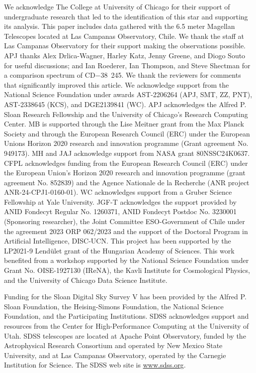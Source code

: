\documentclass{natureprintstyle}
\newcommand{\cdstar}{CD$-$38~245\xspace}
\begin{document}
\begin{addendum}
  
\item [Acknowledgements] 

We acknowledge The College at University of Chicago for their support of undergraduate research that led to the identification of this star and supporting its analysis.
This paper includes data gathered with the 6.5 meter Magellan Telescopes located at Las Campanas Observatory, Chile. We thank the staff at Las Campanas Observatory for their support making the observations possible.
APJ thanks Alex Drlica-Wagner, Harley Katz, Jenny Greene, and Diogo Souto for useful discussions; 
and Ian Roederer, Ian Thompson, and Steve Shectman for a comparison spectrum of \cdstar.
We thank the reviewers for comments that significantly improved this article.
We acknowledge support from the National Science Foundation under awards 
AST-2206264 (APJ, SMT, ZZ, PNT),
AST-2338645 (KCS),
and DGE2139841 (WC).
APJ acknowledges the Alfred P. Sloan Research Fellowship and the University of Chicago's Research Computing Center.
MB is supported through the Lise Meitner grant from the Max Planck Society and through the European Research Council (ERC) under the European Unions Horizon 2020 research and innovation programme (Grant agreement No. 949173). 
MH and JAJ acknowledge support from NASA grant 80NSSC24K0637.
CFPL acknowledges funding from the European Research Council (ERC) under the European Union’s Horizon 2020 research and innovation programme (grant agreement No. 852839) and the Agence Nationale de la Recherche (ANR project ANR-24-CPJ1-0160-01).
WC acknowledges support from a Gruber Science Fellowship at Yale University.
JGF-T acknowledges the support provided by ANID Fondecyt Regular No. 1260371, ANID Fondecyt Postdoc No. 3230001 (Sponsoring researcher), the Joint Committee ESO-Government of Chile under the agreement 2023 ORP 062/2023 and the support of the Doctoral Program in Artificial Intelligence, DISC-UCN.
This project has been supported by the LP2021-9 Lend\"ulet grant of the Hungarian Academy of Sciences.
This work benefited from a workshop supported by the National Science Foundation under Grant No. OISE-1927130 (IReNA), the Kavli Institute for Cosmological Physics, and the University of Chicago Data Science Institute. 

Funding for the Sloan Digital Sky Survey V has been provided by the Alfred P. Sloan Foundation, the Heising-Simons Foundation, the National Science Foundation, and the Participating Institutions. SDSS acknowledges support and resources from the Center for High-Performance Computing at the University of Utah. SDSS telescopes are located at Apache Point Observatory, funded by the Astrophysical Research Consortium and operated by New Mexico State University, and at Las Campanas Observatory, operated by the Carnegie Institution for Science. The SDSS web site is \url{www.sdss.org}.


\end{addendum}
\end{document}
